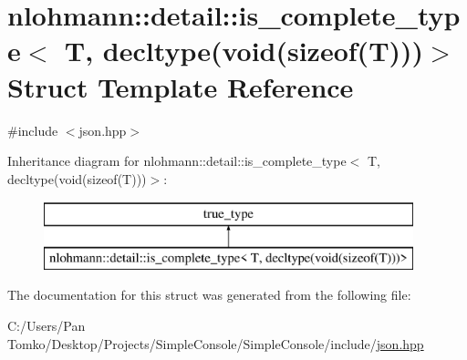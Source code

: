 \hypertarget{structnlohmann_1_1detail_1_1is__complete__type_3_01_t_00_01decltype_07void_07sizeof_07_t_08_08_08_4}{}\section{nlohmann\+::detail\+::is\+\_\+complete\+\_\+type$<$ T, decltype(void(sizeof(T)))$>$ Struct Template Reference}
\label{structnlohmann_1_1detail_1_1is__complete__type_3_01_t_00_01decltype_07void_07sizeof_07_t_08_08_08_4}


{\ttfamily \#include $<$json.\+hpp$>$}

Inheritance diagram for nlohmann\+::detail\+::is\+\_\+complete\+\_\+type$<$ T, decltype(void(sizeof(T)))$>$\+:\begin{figure}[H]
\begin{center}
\leavevmode
\includegraphics[height=2.000000cm]{dc/d2b/structnlohmann_1_1detail_1_1is__complete__type_3_01_t_00_01decltype_07void_07sizeof_07_t_08_08_08_4}
\end{center}
\end{figure}


The documentation for this struct was generated from the following file\+:\begin{DoxyCompactItemize}
\item 
C\+:/\+Users/\+Pan Tomko/\+Desktop/\+Projects/\+Simple\+Console/\+Simple\+Console/include/\mbox{\hyperlink{json_8hpp}{json.\+hpp}}\end{DoxyCompactItemize}
